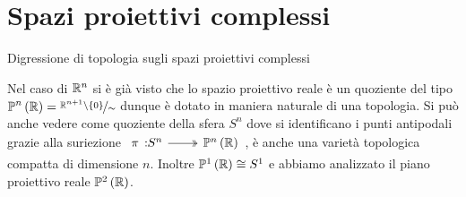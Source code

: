 \section{Spazi proiettivi complessi}
Digressione di topologia sugli spazi proiettivi complessi
\begin{remember}
	Nel caso di $\mathbb{R}^n$ si è già visto che lo spazio proiettivo reale è un quoziente del tipo $\displaystyle \proj[n]{\realset}=\nicefrac{\realset^{n+1}\setminus\{0\}}{\sim}$ dunque è dotato in maniera naturale di una topologia.\newline
	Si può anche vedere come quoziente della sfera $S^n$ dove si identificano i punti antipodali grazie alla suriezione $\surr \pi {S^n} {\proj[n]{\realset}}$, è anche una varietà topologica compatta di dimensione $n$. Inoltre $\proj[1]{\realset}\cong S^1$ e abbiamo analizzato il piano proiettivo reale $\proj[2]{\realset}$.
\end{remember}


